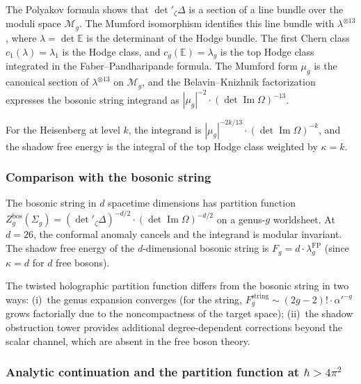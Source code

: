 \begin{remark}
The Polyakov formula shows that $\det{}'_\zeta\Delta$ is a section of a line bundle over the moduli space $\mathcal{M}_g$. The Mumford isomorphism identifies this line bundle with $\lambda^{\otimes 13}$, where $\lambda = \det\mathbb{E}$ is the determinant of the Hodge bundle. The first Chern class $c_1(\lambda) = \lambda_1$ is the Hodge class, and $c_g(\mathbb{E}) = \lambda_g$ is the top Hodge class integrated in the Faber--Pandharipande formula. The Mumford form $\mu_g$ is the canonical section of $\lambda^{\otimes 13}$ on $\mathcal{M}_g$, and the Belavin--Knizhnik factorization expresses the bosonic string integrand as $|\mu_g|^{-2} \cdot (\det\operatorname{Im}\Omega)^{-13}$.

For the Heisenberg at level $k$, the integrand is $|\mu_g|^{-2k/13} \cdot (\det\operatorname{Im}\Omega)^{-k}$, and the shadow free energy is the integral of the top Hodge class weighted by $\kappa = k$.
\end{remark}

\subsubsection{Comparison with the bosonic string}

\begin{remark}[Bosonic string at $d = 26$]
The bosonic string in $d$ spacetime dimensions has partition function $Z_g^{\mathrm{bos}}(\Sigma_g) = (\det{}'_\zeta\Delta)^{-d/2} \cdot (\det\operatorname{Im}\Omega)^{-d/2}$ on a genus-$g$ worldsheet. At $d = 26$, the conformal anomaly cancels and the integrand is modular invariant. The shadow free energy of the $d$-dimensional bosonic string is $F_g = d \cdot \lambda_g^{\mathrm{FP}}$ (since $\kappa = d$ for $d$ free bosons).

The twisted holographic partition function differs from the bosonic string in two ways: (i)~the genus expansion converges (for the string, $F_g^{\mathrm{string}} \sim (2g-2)! \cdot \alpha'^{-g}$ grows factorially due to the noncompactness of the target space); (ii)~the shadow obstruction tower provides additional degree-dependent corrections beyond the scalar channel, which are absent in the free boson theory.
\end{remark}

\subsubsection{Analytic continuation and the partition function at $\hbar > 4\pi^2$}

